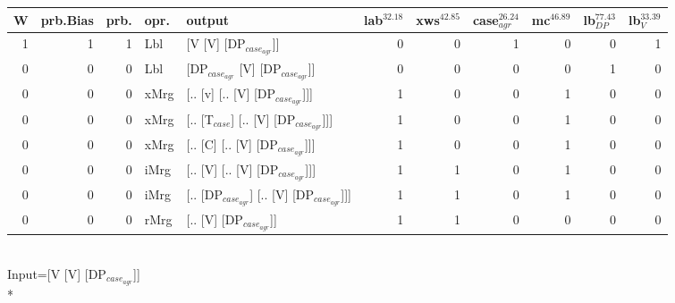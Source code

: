 \begin{tabularx}{\linewidth}{rrrlXrrrrrr}
\hline
   W &   prb.Bias &   prb. & opr.   & output                                    &   lab$^{32.18}$ &   xws$^{42.85}$ &   case$_{agr}^{26.24}$ &   mc$^{46.89}$ &   lb$_{DP}^{77.43}$ &   lb$_{V}^{33.39}$ \\
\hline
   1 &       1 &   1 & Lbl  & [V [V] [DP$_{case_{agr}}$]]                     &             0 &             0 &                  1 &            0 &               0 &              1 \\
   0 &       0 &   0 & Lbl  & [DP$_{case_{agr}}$ [V] [DP$_{case_{agr}}$]]           &             0 &             0 &                  0 &            0 &               1 &              0 \\
   0 &       0 &   0 & xMrg & [.. [v] [.. [V] [DP$_{case_{agr}}$]]]           &             1 &             0 &                  0 &            1 &               0 &              0 \\
   0 &       0 &   0 & xMrg & [.. [T$_{case}$] [.. [V] [DP$_{case_{agr}}$]]]      &             1 &             0 &                  0 &            1 &               0 &              0 \\
   0 &       0 &   0 & xMrg & [.. [C] [.. [V] [DP$_{case_{agr}}$]]]           &             1 &             0 &                  0 &            1 &               0 &              0 \\
   0 &       0 &   0 & iMrg & [.. [V] [.. [V] [DP$_{case_{agr}}$]]]           &             1 &             1 &                  0 &            1 &               0 &              0 \\
   0 &       0 &   0 & iMrg & [.. [DP$_{case_{agr}}$] [.. [V] [DP$_{case_{agr}}$]]] &             1 &             1 &                  0 &            1 &               0 &              0 \\
   0 &       0 &   0 & rMrg & [.. [V] [DP$_{case_{agr}}$]]                    &             1 &             1 &                  0 &            0 &               0 &              0 \\
\hline
\end{tabularx}\endgroup\\
\begingroup\scriptsize Input=[V [V] [DP$_{case_{agr}}$]]\\*
